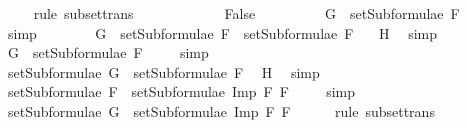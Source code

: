 \begin{isabellebody}
\ {}\ {}\ \isamarkupfalse%
\ {\isacharparenleft}rule\ subset{\isacharunderscore}trans{\isacharparenright}\isanewline
\ \ \ \ \isamarkupfalse%
\isanewline
\ \ \ \ \ \ \isamarkupfalse%
\ False\isanewline
\ \ \ \ \ \ \isamarkupfalse%
\ \isamarkupfalse%
\ {}{\isacharcolon}{\isachardoublequoteopen}G\ {\isasymnotin}\ setSubformulae\ F{}{\isachardoublequoteclose}\ \isamarkupfalse%
\ simp\isanewline
\ \ \ \ \ \ \isamarkupfalse%
\ {\isachardoublequoteopen}G\ {\isasymin}\ setSubformulae\ F{}\ {\isasymunion}\ setSubformulae\ F{}{\isachardoublequoteclose}\ \isamarkupfalse%
\ {}\ H{}\ \isamarkupfalse%
\ simp\isanewline
\ \ \ \ \ \ \isamarkupfalse%
\ \isamarkupfalse%
\ {\isachardoublequoteopen}G\ {\isasymin}\ setSubformulae\ F{}{\isachardoublequoteclose}\ \isamarkupfalse%
\ {}\ \isamarkupfalse%
\ simp\isanewline
\ \ \ \ \ \ \isamarkupfalse%
\ \isamarkupfalse%
\ {}{}{\isacharcolon}{\isachardoublequoteopen}setSubformulae\ G\ {\isasymsubseteq}\ setSubformulae\ F{}{\isachardoublequoteclose}\ \isamarkupfalse%
\ H{}\ \isamarkupfalse%
\ simp\isanewline
\ \ \ \ \ \ \isamarkupfalse%
\ {}{}{\isacharcolon}{\isachardoublequoteopen}setSubformulae\ F{}\ {\isasymsubseteq}\ setSubformulae\ {\isacharparenleft}Imp\ F{}\ F{}{\isacharparenright}{\isachardoublequoteclose}\ \isamarkupfalse%
\ {}\ \isamarkupfalse%
\ simp\isanewline
\ \ \ \ \ \ \isamarkupfalse%
\ {\isachardoublequoteopen}setSubformulae\ G\ {\isasymsubseteq}\ setSubformulae\ {\isacharparenleft}Imp\ F{}\ F{}{\isacharparenright}{\isachardoublequoteclose}\ \isamarkupfalse%
\ {}{}\ {}{}\ \isamarkupfalse%
\ {\isacharparenleft}rule\ subset{\isacharunderscore}trans{\isacharparenright}\isanewline
\ \ \ \ \isamarkupfalse%
\isanewline
\ \ \isamarkupfalse%
\isanewline
{}\isamarkupfalse%
%
\endisatagproof
{\isafoldproof}%
%
\isadelimproof
\isanewline
%
\endisadelimproof
\isanewline
\isanewline
\isanewline
{}\isamarkupfalse%

\end{isabellebody}
